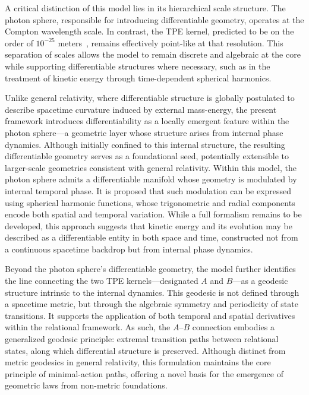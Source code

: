 \documentclass[%
 reprint,
 amsmath,amssymb,
 aps,
]{revtex4-1}
\numberwithin{equation}{section}%
\begin{document}
A critical distinction of this model lies in its hierarchical scale structure. The photon sphere, responsible for introducing differentiable geometry, operates at the Compton wavelength scale. In contrast, the TPE kernel, predicted to be on the order of $10^{-25}$ meters~\cite{hanamura2501.0130}, remains effectively point-like at that resolution. This separation of scales allows the model to remain discrete and algebraic at the core while supporting differentiable structures where necessary, such as in the treatment of kinetic energy through time-dependent spherical harmonics.

Unlike general relativity, where differentiable structure is globally postulated to describe spacetime curvature induced by external mass-energy, the present framework introduces differentiability as a locally emergent feature within the photon sphere—a geometric layer whose structure arises from internal phase dynamics. Although initially confined to this internal structure, the resulting differentiable geometry serves as a foundational seed, potentially extensible to larger-scale geometries consistent with general relativity. Within this model, the photon sphere admits a differentiable manifold whose geometry is modulated by internal temporal phase. It is proposed that such modulation can be expressed using spherical harmonic functions, whose trigonometric and radial components encode both spatial and temporal variation. While a full formalism remains to be developed, this approach suggests that kinetic energy and its evolution may be described as a differentiable entity in both space and time, constructed not from a continuous spacetime backdrop but from internal phase dynamics.

Beyond the photon sphere's differentiable geometry, the model further identifies the line connecting the two TPE kernels—designated $A$ and $B$---as a geodesic structure intrinsic to the internal dynamics. This geodesic is not defined through a spacetime metric, but through the algebraic symmetry and periodicity of state transitions. It supports the application of both temporal and spatial derivatives within the relational framework. As such, the $A$–$B$ connection embodies a generalized geodesic principle: extremal transition paths between relational states, along which differential structure is preserved. Although distinct from metric geodesics in general relativity, this formulation maintains the core principle of minimal-action paths, offering a novel basis for the emergence of geometric laws from non-metric foundations.
\end{document}
